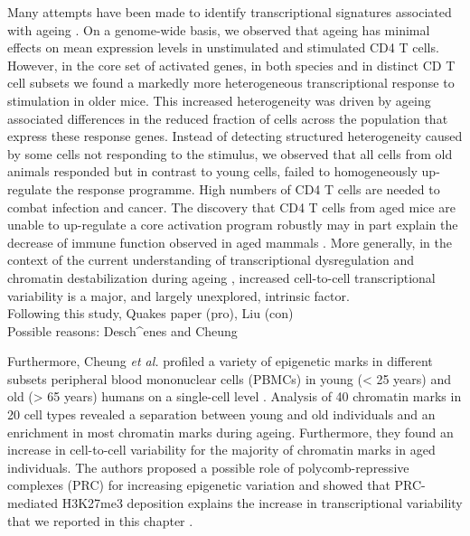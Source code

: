 Many attempts have been made to identify transcriptional signatures associated with ageing \citep{DeMagalhaes2009, Magalhaes2009, Chen2013, Kowalczyk2015}. On a genome-wide basis, we observed that ageing has minimal effects on mean expression levels in unstimulated and stimulated CD4\plus{} T cells. However, in the core set of activated genes, in both species and in distinct CD\plus{} T cell subsets we found a markedly more heterogeneous transcriptional response to stimulation in older mice. This increased heterogeneity was driven by ageing associated differences in the reduced fraction of cells across the population that express these response genes. Instead of detecting structured heterogeneity caused by some cells not responding to the stimulus, we observed that all cells from old animals responded but in contrast to young cells, failed to homogeneously up-regulate the response programme. High numbers of CD4\plus{} T cells are needed to combat infection and cancer. The discovery that CD4\plus{} T cells from aged mice are unable to up-regulate a core activation program robustly may in part explain the decrease of immune function observed in aged mammals \citep{Goronzy2013, Nikolich-Zugich2018}. More generally, in the context of the current understanding of transcriptional dysregulation and chromatin destabilization during ageing \citep{Booth2016}, increased cell-to-cell transcriptional variability is a major, and largely unexplored, intrinsic factor.\\

Following this study, Quakes paper (pro), Liu (con)\\


Possible reasons: Desch^enes and Cheung

Furthermore, Cheung \emph{et al.} profiled a variety of epigenetic marks in different subsets peripheral blood mononuclear cells (PBMCs) in young (< 25 years) and old (> 65 years) humans on a single-cell level \citep{Cheung2018}. Analysis of 40 chromatin marks in 20 cell types revealed a separation between young and old individuals and an enrichment in most chromatin marks during ageing. Furthermore, they found an increase in cell-to-cell variability for the majority of chromatin marks in aged individuals. The authors proposed a possible role of polycomb-repressive complexes (PRC) for increasing epigenetic variation and showed that PRC-mediated H3K27me3 deposition explains the increase in transcriptional variability that we reported in this chapter \citep{Cheung2018}.









